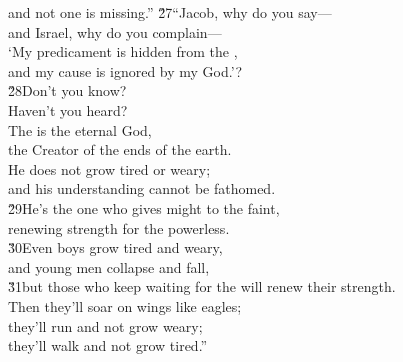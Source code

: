 \begin{poetry}
\poemlll       and not one is missing.''
\poeml \v{27}``Jacob, why do you say--- \\
\poemll    and Israel, why do you complain--- \\
\poeml `My predicament is hidden from the , \\
\poemll    and my cause is ignored by my God.'? \\
\poeml \v{28}Don't you know? \\
\poemll    Haven't you heard? \\
\poeml The  is the eternal God, \\
\poemlll       the Creator of the ends of the earth. \\
\poeml He does not grow tired or weary; \\
\poemll    and his understanding cannot be fathomed. \\
\poeml \v{29}He's the one who gives might to the faint, \\
\poemll    renewing strength for the powerless. \\
\poeml \v{30}Even boys grow tired and weary, \\
\poemll    and young men collapse and fall, \\
\poeml \v{31}but those who keep waiting for the  will renew their strength. \\
\poemll    Then they'll soar on wings like eagles; \\
\poeml they'll run and not grow weary; \\
\poemll    they'll walk and not grow tired.''
\end{poetry}

